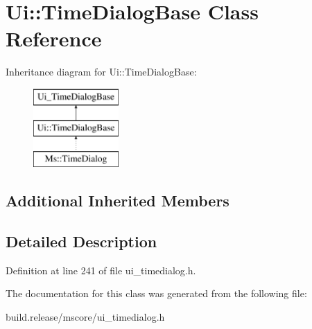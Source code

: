 \hypertarget{class_ui_1_1_time_dialog_base}{}\section{Ui\+:\+:Time\+Dialog\+Base Class Reference}
\label{class_ui_1_1_time_dialog_base}
Inheritance diagram for Ui\+:\+:Time\+Dialog\+Base\+:\begin{figure}[H]
\begin{center}
\leavevmode
\includegraphics[height=3.000000cm]{class_ui_1_1_time_dialog_base}
\end{center}
\end{figure}
\subsection*{Additional Inherited Members}


\subsection{Detailed Description}


Definition at line 241 of file ui\+\_\+timedialog.\+h.



The documentation for this class was generated from the following file\+:\begin{DoxyCompactItemize}
\item 
build.\+release/mscore/ui\+\_\+timedialog.\+h\end{DoxyCompactItemize}
